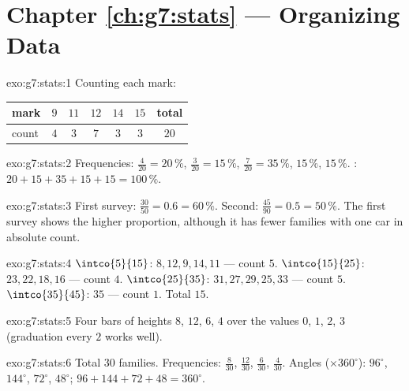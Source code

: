 \section*{Chapter \ref{ch:g7:stats} --- Organizing Data}

\begin{solution}{exo:g7:stats:1}
Counting each mark:
\begin{center}
\renewcommand{\arraystretch}{1.2}
\begin{tabular}{l|ccccc|c}
mark & $9$ & $11$ & $12$ & $14$ & $15$ & total \\
\hline
count & $4$ & $3$ & $7$ & $3$ & $3$ & $20$ \\
\end{tabular}
\end{center}
\end{solution}

\begin{solution}{exo:g7:stats:2}
Frequencies: $\frac{4}{20} = 20\,\%$, $\frac{3}{20} = 15\,\%$,
$\frac{7}{20} = 35\,\%$, $15\,\%$, $15\,\%$. :
$20 + 15 + 35 + 15 + 15 = 100\,\%$. \checkmark
\end{solution}

\begin{solution}{exo:g7:stats:3}
First survey: $\frac{30}{50} = 0.6 = 60\,\%$. Second:
$\frac{45}{90} = 0.5 = 50\,\%$. The first survey shows the higher
proportion, although it has fewer families with one car in absolute
count.
\end{solution}

\begin{solution}{exo:g7:stats:4}
$\intco{5}{15}$: $8, 12, 9, 14, 11$ --- count $5$.
$\intco{15}{25}$: $23, 22, 18, 16$ --- count $4$.
$\intco{25}{35}$: $31, 27, 29, 25, 33$ --- count $5$.
$\intco{35}{45}$: $35$ --- count $1$. Total $15$. \checkmark
\end{solution}

\begin{solution}{exo:g7:stats:5}
Four bars of heights $8$, $12$, $6$, $4$ over the values $0$, $1$,
$2$, $3$ (graduation every $2$ works well).
\end{solution}

\begin{solution}{exo:g7:stats:6}
Total $30$ families. Frequencies: $\frac{8}{30}$, $\frac{12}{30}$,
$\frac{6}{30}$, $\frac{4}{30}$. Angles ($\times 360^\circ$): $96^\circ$,
$144^\circ$, $72^\circ$, $48^\circ$; 
$96 + 144 + 72 + 48 = 360^\circ$. \checkmark
\end{solution}

